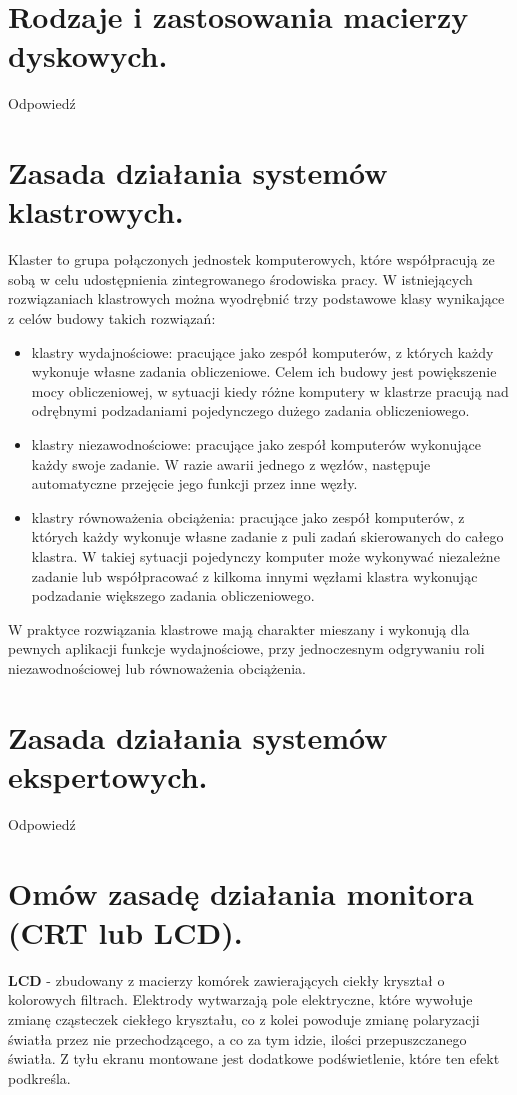\documentclass[12pt,a4paper]{article}
\begin{document}
	\section{Rodzaje i zastosowania macierzy dyskowych.}
	Odpowiedź

	\section{Zasada działania systemów klastrowych.}
	Klaster to grupa połączonych jednostek komputerowych, które współpracują ze sobą w celu udostępnienia zintegrowanego środowiska pracy. W istniejących rozwiązaniach klastrowych można wyodrębnić trzy podstawowe klasy wynikające z celów budowy takich rozwiązań:
	
	\begin{itemize}
		\item klastry wydajnościowe: pracujące jako zespół komputerów, z których każdy wykonuje własne zadania obliczeniowe. Celem ich budowy jest powiększenie mocy obliczeniowej, w sytuacji kiedy różne komputery w klastrze pracują nad odrębnymi podzadaniami pojedynczego dużego zadania obliczeniowego.
	
		\item klastry niezawodnościowe: pracujące jako zespół komputerów wykonujące każdy swoje zadanie. W razie awarii jednego z węzłów, następuje automatyczne przejęcie jego funkcji przez inne węzły.
		
		\item klastry równoważenia obciążenia: pracujące jako zespół komputerów, z których każdy wykonuje własne zadanie z puli zadań skierowanych do całego klastra. W takiej sytuacji pojedynczy komputer może wykonywać niezależne zadanie lub współpracować z kilkoma innymi węzłami klastra wykonując podzadanie większego zadania obliczeniowego.
	\end{itemize}
	
	W praktyce rozwiązania klastrowe mają charakter mieszany i wykonują dla pewnych aplikacji funkcje wydajnościowe, przy jednoczesnym odgrywaniu roli niezawodnościowej lub równoważenia obciążenia.

	\section{Zasada działania systemów ekspertowych.}
	Odpowiedź

	\section{Omów zasadę działania monitora (CRT lub LCD).}
	\textbf{LCD} - zbudowany z macierzy komórek zawierających ciekły kryształ o kolorowych filtrach. Elektrody wytwarzają pole elektryczne, które wywołuje zmianę cząsteczek ciekłego kryształu, co z kolei powoduje zmianę polaryzacji światła przez nie przechodzącego, a co za tym idzie, ilości przepuszczanego światła. Z tyłu ekranu montowane jest dodatkowe podświetlenie, które ten efekt podkreśla.
\end{document}
